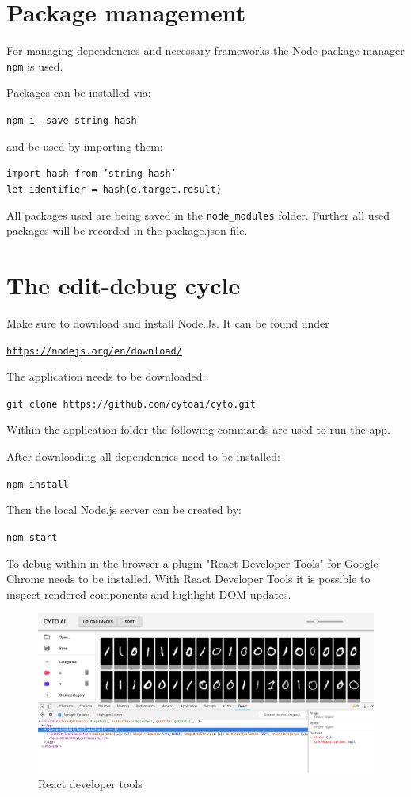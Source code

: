 \section{Package management}
For managing dependencies and necessary frameworks the Node 
package manager \texttt{npm} is used. 

Packages can be installed via:

	\texttt{npm i ---save string-hash}

and be used by importing them:

	\texttt{import hash from 'string-hash'} \\
	\texttt{let identifier = hash(e.target.result)}

All packages used are being saved in the \texttt{node\_modules} folder.
Further all used packages will be recorded in the
package.json file.


\section{The edit-debug cycle}

Make sure to download and install Node.Js. It can be found under

\href{https://nodejs.org/en/download/}{\texttt{https://nodejs.org/en/download/}}


The application needs to be downloaded:

\texttt{git clone https://github.com/cytoai/cyto.git}

Within the application folder the following commands are used to run the app.

After downloading all dependencies need to be installed:

\texttt{npm install}

Then the local Node.js server can be created by:

\texttt{npm start}

To debug within in the browser a plugin "React Developer Tools" for Google Chrome needs to be installed.
With React Developer Tools it is possible to inspect rendered components and highlight DOM updates.

\begin{figure}[H]
	\centering
	\includegraphics[width=0.9\linewidth]{bilder/cyto/ReactDebug.png}
	\caption{React developer tools}
	\label{fig:Developer Tools}
\end{figure}

